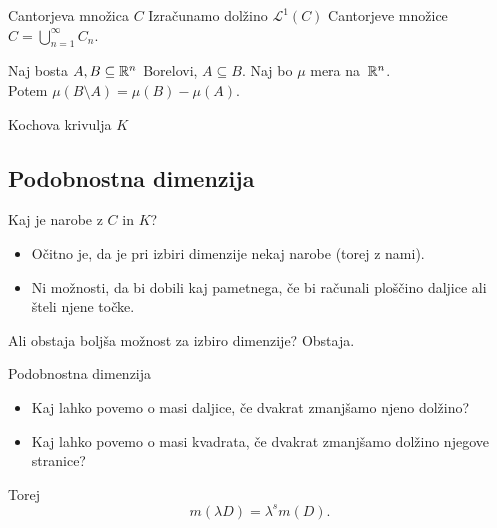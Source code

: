 \documentclass[10pt]{beamer}
\begin{document}
\begin{frame}[t]{Cantorjeva množica \(C\)}
    Izračunamo dolžino \(\mathcal{L}^1(C)\) Cantorjeve množice \(C  = \bigcup_{n=1}^\infty C_n\).

    \begin{center}
    \end{center}  

    \begin{lema}
        Naj bosta \(A, B \subseteq \mathbb{R}^n\) Borelovi, \(A \subseteq B\). Naj bo \(\mu\) mera na~\(\mathbb{R}^n\). \\ Potem \(\mu(B \setminus A) = \mu(B) - \mu(A)\).
    \end{lema}
\end{frame}

\begin{frame}[t]{Kochova krivulja \(K\)}
    \begin{center}
        \drawKoch
    \end{center}    
\end{frame}

\subsection{Podobnostna dimenzija}

\begin{frame}[t]{Kaj je narobe z \(C\) in \(K\)?}
    \pause
    \begin{itemize}
        \item Očitno je, da je pri izbiri dimenzije nekaj narobe (torej z nami). 
        \item Ni možnosti, da bi dobili kaj pametnega, če bi računali ploščino daljice ali šteli njene točke.
    \end{itemize}  
\end{frame}

\begin{frame}[t]{Ali obstaja boljša možnost za izbiro dimenzije?}
    \pause
    Obstaja.
\end{frame}

\begin{frame}[t]{Podobnostna dimenzija}
    \begin{itemize}
        \item Kaj lahko povemo o masi daljice, če dvakrat zmanjšamo njeno dolžino?
        \item Kaj lahko povemo o masi kvadrata, če dvakrat zmanjšamo dolžino njegove stranice?
    \end{itemize}
    \pause
    Torej \[m(\lambda D) = \lambda^s m(D).\]
\end{frame}
\end{document}

